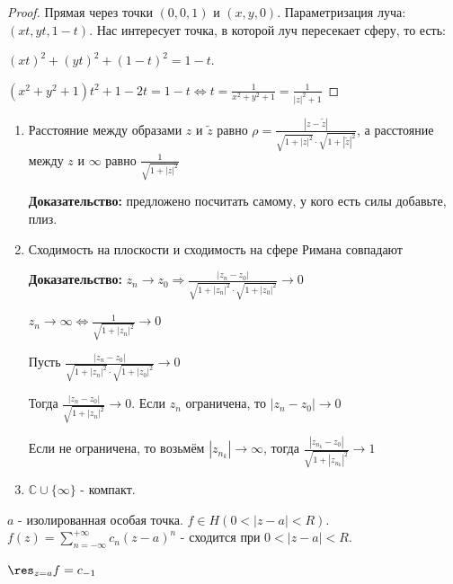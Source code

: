 \begin{proof}
    Прямая через точки $(0, 0, 1)$ и $(x, y, 0)$. Параметризация луча:
    $(xt, yt, 1 - t)$. Нас интересует точка, в которой луч пересекает сферу, то есть:

    $(xt)^2 + (yt)^2 + (1- t)^2 = 1 - t$.

    $(x^2 + y^2 + 1)t^2 + 1 - 2t = 1 - t \Leftrightarrow t = \frac{1}{x^2 + y^2 + 1} = \frac{1}{|z|^2 + 1}$
\end{proof}

\begin{consequence}
    \begin{enumerate}
        \item Расстояние между образами $z$ и $\tilde{z}$ равно $\rho = \frac{|z - \tilde{z}|}{\sqrt{1 + |z|^2} \cdot \sqrt{1 + |\tilde{z}|^2}}$,
        а расстояние между $z$ и $\infty$ равно $\frac{1}{\sqrt{1 + |z|^2}}$

        \textbf{Доказательство:} предложено посчитать самому, у кого есть силы добавьте, плиз.
        
        \item Сходимость на плоскости и сходимость на сфере Римана совпадают
        
        \textbf{Доказательство:} $z_n \to z_0 \Rightarrow \frac{|z_n - z_0|}{\sqrt{1 + |z_n|^2}\cdot \sqrt{1 + |z_0|^2}} \to 0$

        $z_n \to \infty \Leftrightarrow \frac{1}{\sqrt{1 + |z_n|^2}} \to 0$

        Пусть $\frac{|z_n - z_0|}{\sqrt{1 + |z_n|^2}\cdot \sqrt{1 + |z_0|^2}} \to 0$

        Тогда $\frac{|z_n - z_0|}{\sqrt{1 + |z_n|^2}} \to 0$. Если $z_n$  ограничена, то $|z_n - z_0| \to 0$

        Если не ограничена, то возьмём $|z_{n_k}| \to \infty$, тогда $\frac{|z_{n_k} - z_0|}{\sqrt{1 + |z_{n_k}|^2}} \to 1$

        \item $\mathbb{C} \cup \{ \infty \}$ - компакт.
    \end{enumerate}
\end{consequence}


\begin{definition}
    $a$ - изолированная особая точка. $f \in H(0 < |z - a| < R)$. 
    $f(z) = \sum_{n = -\infty}^{+\infty} c_n (z - a)^n$ - сходится при $0 < |z - a| < R$.

    $\res_{z = a} f = c_{-1}$
\end{definition}

